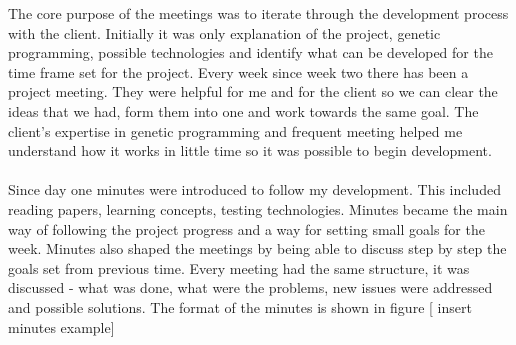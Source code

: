 The core purpose of the meetings was to iterate through the development process with the
client. Initially it was only explanation of the project, genetic programming, possible
technologies and identify what can be developed for the time frame set for the project.
Every week since week two there has been a project meeting. They were helpful for me and 
for the client so we can clear the ideas that we had, form them into one and work towards
the same goal. The client's expertise in genetic programming and frequent meeting helped me 
understand how it works in little time so it was possible to begin development.
\paragraph{}
Since day one minutes were introduced to follow my development. This included reading
papers, learning concepts, testing technologies. Minutes became the main way of following
the project progress and a way for setting small goals for the week. Minutes also shaped
the meetings by being able to discuss step by step the goals set from previous time. Every
meeting had the same structure, it was discussed - what was done, what were the problems, 
new issues were addressed and possible solutions. The format of the minutes is shown
in figure [ insert minutes example]
